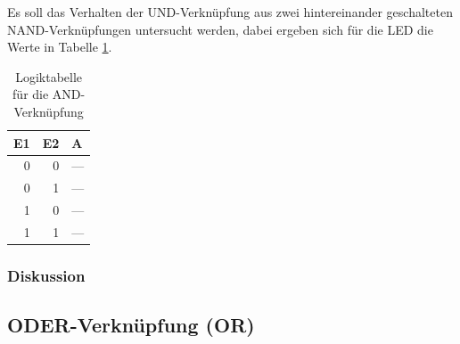 \documentclass[12pt,a4paper]{article}
\begin{document}
Es soll das Verhalten der UND-Verknüpfung aus zwei hintereinander geschalteten NAND-Verknüpfungen untersucht werden, dabei ergeben sich für die LED die Werte in Tabelle \ref{tab:2_2}.

\begin{table}[H]
\begin{center}
\begin{tabular}{r|r|l}

\multicolumn{1}{l|}{E1} & \multicolumn{1}{l|}{E2} & A \\ \hline \hline
0 & 0 & --- \\ 
0 & 1 & --- \\ 
1 & 0 & --- \\ 
1 & 1 & --- \\ 
\end{tabular}
\end{center}
\caption{Logiktabelle für die AND-Verknüpfung}
\label{tab:2_2}
\end{table}


\subsubsection*{Diskussion}

\subsection{ODER-Verknüpfung (OR)}
\end{document}
